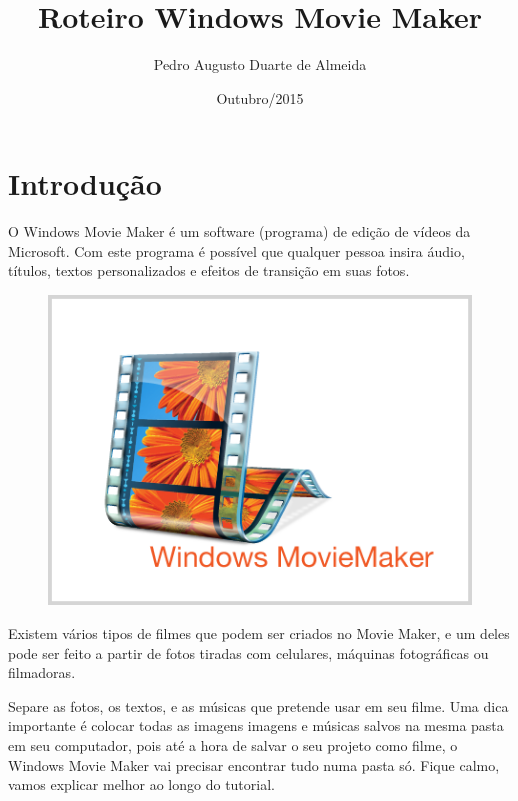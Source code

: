 \documentclass{article}
\title{Roteiro Windows Movie Maker}
\author{Pedro Augusto Duarte de Almeida}
\date{Outubro/2015}
\begin{document}
\maketitle

\section{Introdução}
O Windows Movie Maker é um software (programa) de edição de vídeos da Microsoft.
Com este programa é possível que qualquer pessoa insira áudio, títulos, textos personalizados e efeitos de transição em suas fotos.

\begin{figure}[h!]
\centering
\includegraphics[scale=0.5]{movie-maker.png}
\end{figure}

Existem vários tipos de filmes que podem ser criados no Movie Maker, e um deles pode ser feito a partir de fotos tiradas com celulares, máquinas fotográficas ou filmadoras. \newline

Separe as fotos, os textos, e as músicas que pretende usar em seu filme. Uma dica importante é colocar todas as imagens imagens e músicas salvos na mesma pasta em seu computador, pois até a hora de salvar o seu projeto como filme, o Windows Movie Maker vai precisar encontrar tudo numa pasta só. Fique calmo, vamos explicar melhor ao longo do tutorial.
\end{document}
